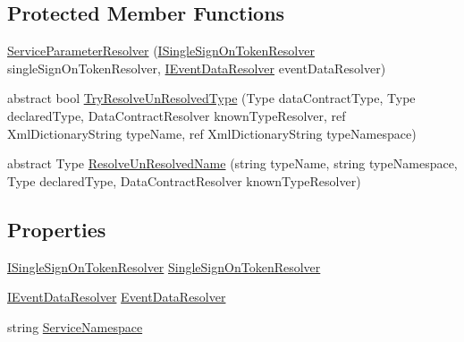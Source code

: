 \subsection*{Protected Member Functions}
\begin{DoxyCompactItemize}
\item 
\hyperlink{classCqrs_1_1Services_1_1ServiceParameterResolver_a635623bf86cf7b365a1b748dcc02daa8_a635623bf86cf7b365a1b748dcc02daa8}{Service\+Parameter\+Resolver} (\hyperlink{interfaceCqrs_1_1Services_1_1ISingleSignOnTokenResolver}{I\+Single\+Sign\+On\+Token\+Resolver} single\+Sign\+On\+Token\+Resolver, \hyperlink{interfaceCqrs_1_1Services_1_1IEventDataResolver}{I\+Event\+Data\+Resolver} event\+Data\+Resolver)
\item 
abstract bool \hyperlink{classCqrs_1_1Services_1_1ServiceParameterResolver_a943e9bb30a085ba6783f6f8a2aa73315_a943e9bb30a085ba6783f6f8a2aa73315}{Try\+Resolve\+Un\+Resolved\+Type} (Type data\+Contract\+Type, Type declared\+Type, Data\+Contract\+Resolver known\+Type\+Resolver, ref Xml\+Dictionary\+String type\+Name, ref Xml\+Dictionary\+String type\+Namespace)
\item 
abstract Type \hyperlink{classCqrs_1_1Services_1_1ServiceParameterResolver_abc39516ffe5d8fca43502e7902791ff8_abc39516ffe5d8fca43502e7902791ff8}{Resolve\+Un\+Resolved\+Name} (string type\+Name, string type\+Namespace, Type declared\+Type, Data\+Contract\+Resolver known\+Type\+Resolver)
\end{DoxyCompactItemize}
\subsection*{Properties}
\begin{DoxyCompactItemize}
\item 
\hyperlink{interfaceCqrs_1_1Services_1_1ISingleSignOnTokenResolver}{I\+Single\+Sign\+On\+Token\+Resolver} \hyperlink{classCqrs_1_1Services_1_1ServiceParameterResolver_a08650fb09869509a27501652649738f4_a08650fb09869509a27501652649738f4}{Single\+Sign\+On\+Token\+Resolver}
\item 
\hyperlink{interfaceCqrs_1_1Services_1_1IEventDataResolver}{I\+Event\+Data\+Resolver} \hyperlink{classCqrs_1_1Services_1_1ServiceParameterResolver_a015f7092810d25cfb1ca266b6bc55c28_a015f7092810d25cfb1ca266b6bc55c28}{Event\+Data\+Resolver}
\item 
string \hyperlink{classCqrs_1_1Services_1_1ServiceParameterResolver_a37238c90755acb0d00951a234e26445c_a37238c90755acb0d00951a234e26445c}{Service\+Namespace}
\end{DoxyCompactItemize}


